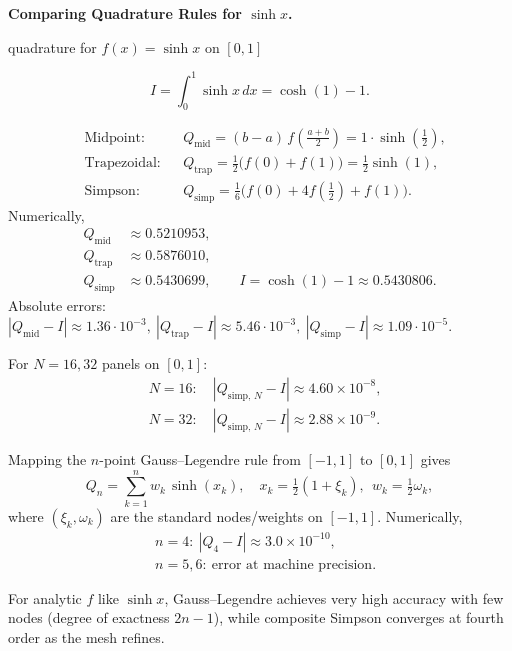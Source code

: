 \begin{problem}[CP-II-0377]
\label{prob:cp-ii-0377}
\textbf{Comparing Quadrature Rules for \(\sinh x\).}

\hspace*{1.5em}quadrature for $f(x)=\sinh x$ on $[0,1]$

\[
I=\int_{0}^{1}\sinh x\,dx=\cosh(1)-1.
\]

\[
\begin{aligned}
	&\text{Midpoint:} &&Q_{\mathrm{mid}}=(b-a)\,f\!\left(\tfrac{a+b}{2}\right)=1\cdot \sinh\!\left(\tfrac12\right),\\[4pt]
	&\text{Trapezoidal:} &&Q_{\mathrm{trap}}=\tfrac{1}{2}\big(f(0)+f(1)\big)=\tfrac12\sinh(1),\\[4pt]
	&\text{Simpson:} &&Q_{\mathrm{simp}}=\tfrac{1}{6}\Big(f(0)+4f\!\left(\tfrac12\right)+f(1)\Big).
\end{aligned}
\]
Numerically,
\[
\begin{aligned}
	Q_{\mathrm{mid}}&\approx 0.5210953, \\
	Q_{\mathrm{trap}}&\approx 0.5876010, \\
	Q_{\mathrm{simp}}&\approx 0.5430699, \qquad
	I=\cosh(1)-1\approx 0.5430806.
\end{aligned}
\]
Absolute errors:
\(
|Q_{\mathrm{mid}}-I|\approx 1.36\cdot 10^{-3},\
|Q_{\mathrm{trap}}-I|\approx 5.46\cdot 10^{-3},\
|Q_{\mathrm{simp}}-I|\approx 1.09\cdot 10^{-5}.
\)

For $N=16,32$ panels on $[0,1]$:
\[
\begin{aligned}
	&N=16:\quad |Q_{\mathrm{simp},\,N}-I|\approx 4.60\times 10^{-8},\\
	&N=32:\quad |Q_{\mathrm{simp},\,N}-I|\approx 2.88\times 10^{-9}.
\end{aligned}
\]

Mapping the $n$-point Gauss--Legendre rule from $[-1,1]$ to $[0,1]$ gives
\[
Q_n=\sum_{k=1}^{n} w_k\,\sinh(x_k),\quad
x_k=\tfrac{1}{2}(1+\xi_k),\ \ w_k=\tfrac{1}{2}\omega_k,
\]
where $(\xi_k,\omega_k)$ are the standard nodes/weights on $[-1,1]$.
Numerically,
\[
\begin{aligned}
	&n=4:\ |Q_4-I|\approx 3.0\times 10^{-10},\\
	&n=5,6:\ \text{error at machine precision}.
\end{aligned}
\]

For analytic $f$ like $\sinh x$, Gauss--Legendre achieves very high accuracy with few nodes
(degree of exactness $2n-1$), while composite Simpson converges at fourth order as the mesh refines.
\end{problem}

